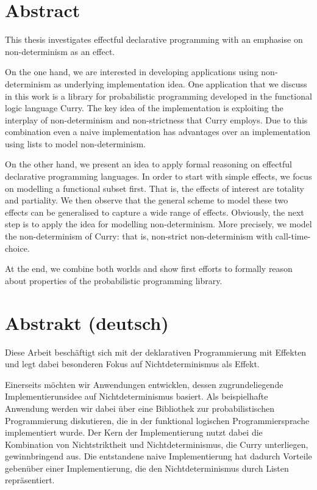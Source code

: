 %
\begingroup
\let\cleardoublepage\clearpage

\chapter*{Abstract}
\label{sec:abstract}
This thesis investigates effectful declarative programming with an
emphasise on non-determinism as an effect.

On the one hand, we are interested in developing applications using
non-determinism as underlying implementation idea.
One application that we discuss in this work is a library for
probabilistic programming developed in the functional logic language
Curry.
The key idea of the implementation is exploiting the interplay of
non-determinism and non-strictness that Curry employs.
Due to this combination even a naive implementation has advantages
over an implementation using lists to model non-determinism.

On the other hand, we present an idea to apply formal reasoning on
effectful declarative programming languages.
In order to start with simple effects, we focus on modelling a
functional subset first.
That is, the effects of interest are totality and partiality.
We then observe that the general scheme to model these two effects can
be generalised to capture a wide range of effects.
Obviously, the next step is to apply the idea for modelling
non-determinism.
More precisely, we model the non-determinism of Curry: that is,
non-strict non-determinism with call-time-choice.

At the end, we combine both worlds and show first efforts to formally
reason about properties of the probabilistic programming library.

\chapter*{Abstrakt (deutsch)}
\label{sec:abstract-diff}

Diese Arbeit besch\"aftigt sich mit der deklarativen
Programmierung mit Effekten und legt dabei besonderen Fokus auf
Nichtdeterminismus als Effekt.

Einerseits m\"ochten wir Anwendungen entwicklen, dessen
zugrundeliegende Implementierunsidee auf Nichtdeterminismus basiert.
Als beispielhafte Anwendung werden wir dabei \"uber eine Bibliothek zur
probabilistischen Programmierung diskutieren, die in der funktional logischen
Programmiersprache implementiert wurde.
Der Kern der Implementierung nutzt dabei die Kombination von
Nichtstriktheit und Nichtdeterminismus, die Curry unterliegen,
gewinnbringend aus.
Die entstandene naive Implementierung hat dadurch Vorteile geben\"uber
einer Implementierung, die den Nichtdeterminismus durch Listen repr\"asentiert.

